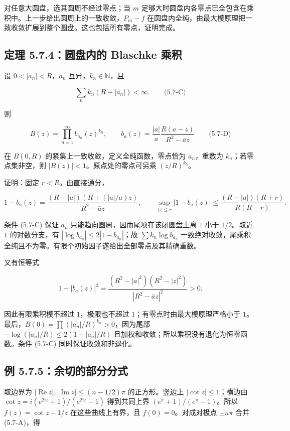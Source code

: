 \documentclass[11pt,a4paper]{article}
\begin{document}
对任意大圆盘，选其圆周不经过零点；当 \(m\)
足够大时圆盘内各零点已全包含在乘积中。上一步给出圆周上的一致收敛，\(P_m-f\)
在圆盘内全纯，由最大模原理把一致收敛扩展到整个圆盘。这也包括所有零点，证明完成。

\subsection{定理 5.7.4：圆盘内的 Blaschke 乘积}\label{ch05-s7-heading-4}

设 \(0<|a_n|<R\)，\(a_n\) 互异，\(k_n\in\mathbb N\)，且

\[
\sum_n k_n(R-|a_n|)<\infty.
\qquad\text{(5.7-C)}
\]

则

\[
B(z)=\prod_{n=1}^\infty b_{a_n}(z)^{k_n},\qquad
b_a(z)=\frac{|a|}{a}\frac{R(a-z)}{R^2-\bar az}
\qquad\text{(5.7-D)}
\]

在 \(B(0,R)\) 的紧集上一致收敛，定义全纯函数，零点恰为 \(a_n\)，重数为
\(k_n\)；若零点集非空，则 \(|B(z)|<1\)。原点处的零点可另乘
\((z/R)^{k_0}\)。

证明：固定 \(r<R\)。由直接通分，

\[
1-b_a(z)=\frac{(R-|a|)(R+(|a|/a)z)}{R^2-\bar az},\qquad
\sup_{|z|\le r}|1-b_a(z)|
\le\frac{(R-|a|)(R+r)}{R(R-r)}.
\]

条件 (5.7-C) 保证 \(a_n\) 只能趋向圆周，因而尾项在该闭圆盘上离 \(1\)
小于 \(1/2\)。取近 \(1\) 的对数分支，有
\(|\log b_{a_n}|\le2|1-b_{a_n}|\)；故 \(\sum k_n\log b_{a_n}\)
一致绝对收敛，尾乘积全纯且不为零。有限个初始因子遂给出全部零点及其精确重数。

又有恒等式

\[
1-|b_a(z)|^2
=\frac{(R^2-|a|^2)(R^2-|z|^2)}{|R^2-\bar az|^2}>0.
\]

因此有限乘积模不超过 \(1\)，极限也不超过
\(1\)；有零点时由最大模原理严格小于
\(1\)。最后，\(B(0)=\prod(|a_n|/R)^{k_n}>0\)，因为尾部
\(-\log(|a_n|/R)\le2(1-|a_n|/R)\)
且加权和收敛；所以乘积没有退化为恒零函数。条件 (5.7-C)
同时保证收敛和非退化。

\subsection{例 5.7.5：余切的部分分式}\label{ch05-s7-heading-5}

取边界为 \(|\operatorname{Re}z|,|\operatorname{Im}z|\le(n-1/2)\pi\)
的正方形。竖边上 \(|\cot z|\le1\)；横边由
\(\cot z=i(e^{2iz}+1)/(e^{2iz}-1)\) 得到共同上界
\((e^\pi+1)/(e^\pi-1)\)。所以 \(f(z)=\cot z-1/z\) 在这些曲线上有界，且
\(f(0)=0\)。对成对极点 \(\pm n\pi\) 合并 (5.7-A)，得
\end{document}
